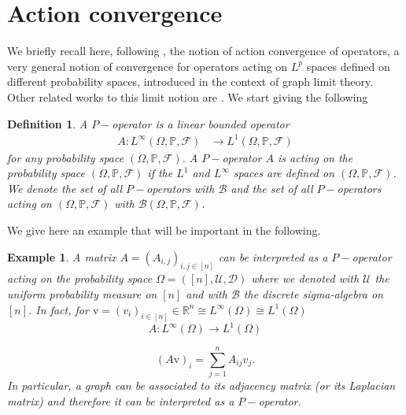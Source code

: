 \documentclass[11pt]{article}
\newtheorem{definition}[theorem]{Definition}
\newtheorem{example}[theorem]{Example}
\def\R{\mathbb{R}}
\def\P{\mathbb{P}}
\begin{document}
\section{Action convergence}\label{SecActionConve}
We briefly recall here, following \cite{backhausz2018action}, the notion of action convergence of operators, a very general notion of convergence for operators acting on $L^p$ spaces defined on different probability spaces, introduced in the context of graph limit theory. Other related works to this limit notion are \cite{ArankaAction2022,MeasTheorActionZucal}.\newline
We start giving the following
\begin{definition}
A $P-$\emph{operator} is a linear bounded operator $$\begin{aligned}
     A:L^\infty(\Omega, \P,\mathcal{F})&\longrightarrow L^1(\Omega,\P,\mathcal{F})
\end{aligned}
$$
for any probability space $(\Omega, \P,\mathcal{F})$.\newline
A $P-$operator $A$ is acting on the probability space $(\Omega, \P,\mathcal{F})$ if the $L^1$ and $L^\infty$ spaces are defined on $(\Omega, \P,\mathcal{F})$. We denote the set of all $P-$operators with $\mathcal{B}$ and the set of all $P-$operators acting on $(\Omega, \P,\mathcal{F})$ with $\mathcal{B}(\Omega, \P,\mathcal{F})$.
\end{definition}

We give here an example that will be important in the following.
\begin{example}
A matrix $A=(A_{i,j})_{i,j\in [n]}$ can be interpreted as a $P-$operator acting on the probability space $\Omega=([n],\mathcal{U},\mathcal{D})$ where we denoted with $\mathcal{U}$ the uniform probability measure on $[n]$ and with $\mathcal{B}$ the discrete sigma-algebra on $[n]$. In fact, for $\mathrm{v}=(v_i)_{i\in [n]}\in \R^n\cong L^{\infty}(\Omega)\cong L^1(\Omega)$
$$
A:L^{\infty}(\Omega)\longrightarrow L^1(\Omega)
$$

$$
(A\mathrm{v})_i=\sum^n_{j=1}A_{ij}v_j.
$$ In particular, a graph can be associated to its adjacency matrix (or its Laplacian matrix) and therefore it can be interpreted as a $P-$operator.
\end{example}
\end{document}
